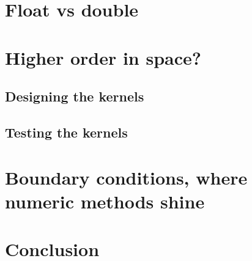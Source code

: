 \documentclass[pdftex,12pt,a4paper]{article}
\begin{document}
	\section{Float vs double}
	
	\section{Higher order in space?}
		
	\subsection{Designing the kernels}
		
	\subsection{Testing the kernels}
		
	\section{Boundary conditions, where numeric methods shine}
		
	\section{Conclusion}
		
	
    
\end{document}

